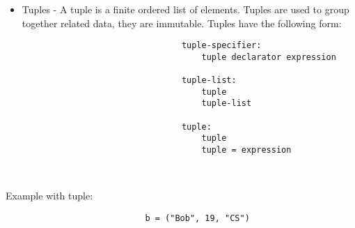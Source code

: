 \documentclass[./LRM_main.tex]{subfiles}
\begin{document}
\begin{itemize}
    \item Tuples - A tuple is a finite ordered list of elements. Tuples are used to group together related data, they are immutable. Tuples have the following form:
    \begin{lstlisting}
                                tuple-specifier:
                                    tuple declarator expression
                                    
                                tuple-list:
                                    tuple
                                    tuple-list
                                    
                                tuple:
                                    tuple
                                    tuple = expression
                                    
                                    
    \end{lstlisting}
    
\end{itemize}

Example with tuple:
\begin{lstlisting}
                            b = ("Bob", 19, "CS")
\end{lstlisting}



\end{document}
